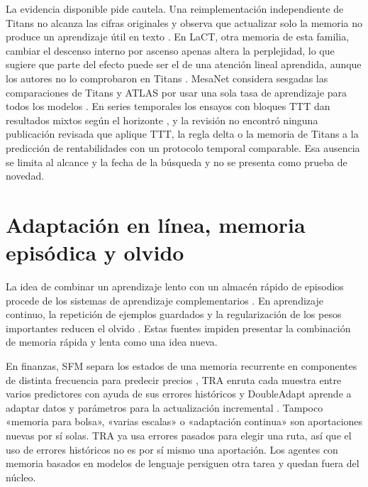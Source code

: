\documentclass[11pt,a4paper]{report}
\begin{document}
La evidencia disponible pide cautela. Una reimplementación independiente de
Titans no alcanza las cifras originales y observa que actualizar solo la
memoria no produce un aprendizaje útil en texto
\parencite{dinepi2025titansrevisited}. En LaCT, otra memoria de esta familia, cambiar el
descenso interno por ascenso apenas altera la perplejidad, lo que sugiere que
parte del efecto puede ser el de una atención lineal aprendida, aunque los
autores no lo comprobaron en Titans \parencite{liu2026tttla}. MesaNet considera
sesgadas las comparaciones de Titans y ATLAS por usar una sola tasa de
aprendizaje para todos los modelos \parencite{vonoswald2026mesanet}. En series temporales los ensayos con bloques
TTT dan resultados mixtos según el horizonte \parencite{christou2024ttlts}, y
la revisión no encontró ninguna publicación revisada que aplique TTT, la regla
delta o la memoria de Titans a la predicción de rentabilidades con un
protocolo temporal comparable. Esa ausencia se limita al alcance y la fecha de
la búsqueda y no se presenta como prueba de novedad.

\section{Adaptación en línea, memoria episódica y olvido}
La idea de combinar un aprendizaje lento con un almacén rápido de episodios
procede de los sistemas de aprendizaje complementarios
\parencite{mcclelland1995cls}. En aprendizaje continuo, la repetición de
ejemplos guardados y la regularización de los pesos importantes reducen el
olvido \parencite{rolnick2019replay,chaudhry2019replay,buzzega2020der,kirkpatrick2017ewc}.
Estas fuentes impiden presentar la combinación de memoria rápida y lenta como
una idea nueva.

En finanzas, SFM separa los estados de una memoria recurrente en componentes
de distinta frecuencia para predecir precios \parencite{zhang2017sfm}, TRA
enruta cada muestra entre varios predictores con ayuda de sus errores
históricos \parencite{lin2021tra} y DoubleAdapt aprende a adaptar datos y
parámetros para la actualización incremental \parencite{zhao2023doubleadapt}.
Tampoco «memoria para bolsa», «varias escalas» o «adaptación continua» son
aportaciones nuevas por sí solas.
TRA ya usa errores pasados para elegir una ruta, así que el uso de errores
históricos no es por sí mismo una aportación. Los agentes con memoria basados
en modelos de lenguaje \parencite{yu2024finmem} persiguen otra tarea y quedan
fuera del núcleo.
\end{document}
